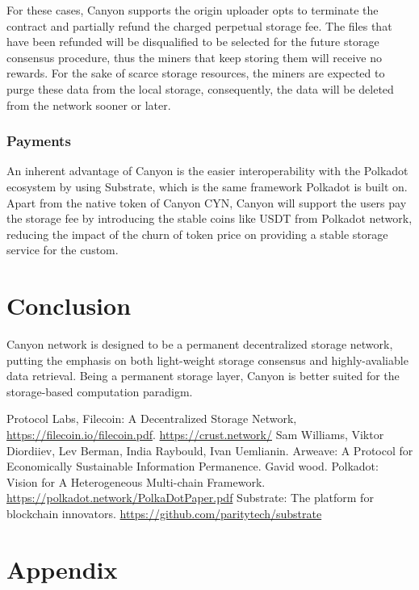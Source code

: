 \documentclass[]{article}
\begin{document}
For these cases, Canyon supports the origin uploader opts to terminate the contract and partially refund the charged perpetual storage fee. The files that have been refunded will be disqualified to be selected for the future storage consensus procedure, thus the miners that keep storing them will receive no rewards. For the sake of scarce storage resources, the miners are expected to purge these data from the local storage, consequently, the data will be deleted from the network sooner or later.

\subsubsection{Payments}

An inherent advantage of Canyon is the easier interoperability with the Polkadot\cite{ref4} ecosystem by using Substrate\cite{ref5}, which is the same framework Polkadot is built on. Apart from the native token of Canyon CYN, Canyon will support the users pay the storage fee by introducing the stable coins like USDT from Polkadot network, reducing the impact of the churn of token price on providing a stable storage service for the custom.



\section{Conclusion}

Canyon network is designed to be a permanent decentralized storage network, putting the emphasis on both light-weight storage consensus and highly-avaliable data retrieval. Being a permanent storage layer, Canyon is better suited for the storage-based computation paradigm.

\begin{thebibliography}{99}
Protocol Labs, Filecoin: A Decentralized Storage Network, \url{https://filecoin.io/filecoin.pdf}.
\url{https://crust.network/}
Sam Williams, Viktor Diordiiev, Lev Berman, India Raybould, Ivan Uemlianin. Arweave: A Protocol for Economically Sustainable Information Permanence.
Gavid wood. Polkadot: Vision for A Heterogeneous Multi-chain Framework. \url{https://polkadot.network/PolkaDotPaper.pdf}
Substrate: The platform for blockchain innovators. \url{https://github.com/paritytech/substrate}
\end{thebibliography}

\appendix
\section{Appendix}
\end{document}
